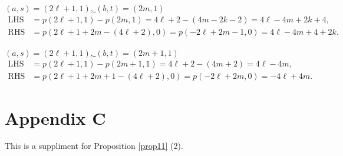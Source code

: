 \documentclass[12pt]{amsart}
\theoremstyle{definition}
\begin{document}
{\noindent\underline{$(a,s)=(2\ell+1,1)$, $(b,t)=(2m,1)$}
\begin{align*}
  \text{LHS} &= p(2\ell+1,1)-p(2m,1)=4\ell+2-(4m-2k-2)=4\ell-4m+2k+4,\\
  \text{RHS} &= p(2\ell+1+2m-(4\ell+2),0)
  = p(-2\ell+2m-1,0)=4\ell-4m+4+2k.
\end{align*}

\noindent\underline{$(a,s)=(2\ell+1,1)$, $(b,t)=(2m+1,1)$}
\begin{align*}
  \text{LHS} &= p(2\ell+1,1)-p(2m+1,1)=4\ell+2-(4m+2)=4\ell-4m,\\
  \text{RHS} &= p(2\ell+1+2m+1-(4\ell+2),0)
  = p(-2\ell+2m,0)=-4\ell+4m.
\end{align*}
}

\section*{Appendix C}
This is a suppliment for Proposition \ref{prop11} (2).
\medskip
\end{document}
